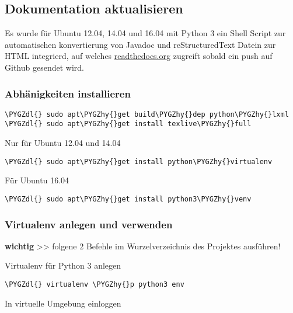 \documentclass[letterpaper,10pt,ngerman]{sphinxmanual}
\def\PYGZdl{\char`\$}
\def\PYGZhy{\char`\-}
\begin{document}
\subsection{Dokumentation aktualisieren}
\label{docs:dokumentation-aktualisieren}
Es wurde für Ubuntu 12.04, 14.04 und 16.04 mit Python 3 ein Shell Script zur automatischen konvertierung von Javadoc und reStructuredText Datein
zur HTML integrierd, auf welches \href{https://readthedocs.org/}{readthedocs.org} zugreift sobald ein push auf Github gesendet wird.


\subsubsection{Abhänigkeiten installieren}
\label{docs:abhanigkeiten-installieren}
\begin{Verbatim}[commandchars=\\\{\}]
\PYGZdl{} sudo apt\PYGZhy{}get build\PYGZhy{}dep python\PYGZhy{}lxml
\PYGZdl{} sudo apt\PYGZhy{}get install texlive\PYGZhy{}full
\end{Verbatim}

Nur für Ubuntu 12.04 und 14.04

\begin{Verbatim}[commandchars=\\\{\}]
\PYGZdl{} sudo apt\PYGZhy{}get install python\PYGZhy{}virtualenv
\end{Verbatim}

Für Ubuntu 16.04

\begin{Verbatim}[commandchars=\\\{\}]
\PYGZdl{} sudo apt\PYGZhy{}get install python3\PYGZhy{}venv
\end{Verbatim}


\subsubsection{Virtualenv anlegen und verwenden}
\label{docs:virtualenv-anlegen-und-verwenden}
\textbf{wichtig} \textgreater{}\textgreater{} folgene 2 Befehle im Wurzelverzeichnis des Projektes ausführen!

Virtualenv für Python 3 anlegen

\begin{Verbatim}[commandchars=\\\{\}]
\PYGZdl{} virtualenv \PYGZhy{}p python3 env
\end{Verbatim}

In virtuelle Umgebung einloggen
\end{document}
